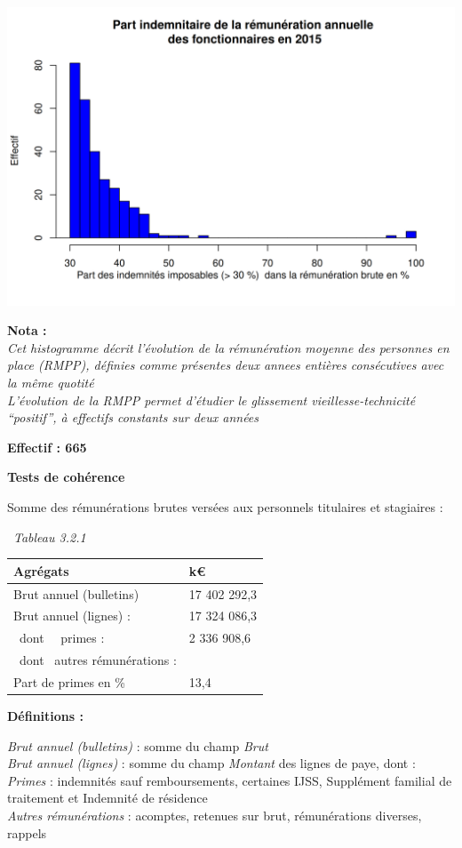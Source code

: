 \includegraphics{altair_files/figure-latex/unnamed-chunk-76-6.png}

\textbf{Nota :}\\
\emph{Cet histogramme décrit l'évolution de la rémunération moyenne des
personnes en place (RMPP), définies comme présentes deux annees entières
consécutives avec la même quotité}\\
\emph{L'évolution de la RMPP permet d'étudier le glissement
vieillesse-technicité ``positif'', à effectifs constants sur deux
années}

\textbf{Effectif : 665 }

\textbf{Tests de cohérence}

Somme des rémunérations brutes versées aux personnels titulaires et
stagiaires :

~\emph{Tableau 3.2.1}

\begin{longtable}[]{@{}ll@{}}
\toprule
Agrégats & k€\tabularnewline
\midrule
\endhead
Brut annuel (bulletins) & 17 402 292,3\tabularnewline
Brut annuel (lignes) : & 17 324 086,3\tabularnewline
~dont ~~primes : & 2 336 908,6\tabularnewline
~dont ~autres rémunérations : &\tabularnewline
Part de primes en \% & 13,4\tabularnewline
\bottomrule
\end{longtable}

\textbf{Définitions :}

\emph{Brut annuel (bulletins)} : somme du champ \emph{Brut}\\
\emph{Brut annuel (lignes)} : somme du champ \emph{Montant} des lignes
de paye, dont :\\
\emph{Primes} : indemnités sauf remboursements, certaines IJSS,
Supplément familial de traitement et Indemnité de résidence\\
\emph{Autres rémunérations} : acomptes, retenues sur brut, rémunérations
diverses, rappels

